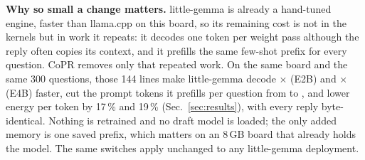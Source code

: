 \documentclass[lettersize,journal]{IEEEtran}
\newcommand{\sys}{CoPR}
\newcommand{\lc}{llama.cpp}
\newcommand{\lgm}{little-gemma}
\begin{document}
\textbf{Why so small a change matters.} \lgm{} is already a hand-tuned engine,
faster than \lc{} on this board, so its remaining cost is not in the kernels but
in work it repeats: it decodes one token per weight pass although the reply
often copies its context, and it prefills the same few-shot prefix for every
question. \sys{} removes only that repeated work. On the same board and the same
300 questions, those 144 lines make \lgm{} decode \EtwoSpG$\times$ (E2B) and
\EfourSpG$\times$ (E4B) faster, cut the prompt tokens it prefills per question
from \EtwoPrmG{} to \EtwoPrmA{}, and lower energy per token by 17\,\% and
19\,\% (Sec.~\ref{sec:results}), with every reply byte-identical. Nothing is
retrained and no draft model is loaded; the only added memory is one saved
prefix, which matters on an 8\,GB board that already holds the model. The same switches apply unchanged to
any \lgm{} deployment.
\end{document}
